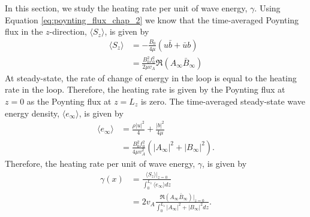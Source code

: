 In this section, we study the heating rate per unit of wave energy, $\gamma$. Using Equation \eqref{eq:poynting_flux_chap_2} we know that the time-averaged Poynting flux in the $z$-direction, $\langle S_z \rangle$, is given by
\begin{equation}
    \begin{aligned}
    \langle S_z \rangle &= -\frac{B_0}{4\mu}(u\bar{b} + \bar{u}b) \\
    &= \frac{B_0^2f_0^2}{2\mu v_A}\Re(A_\infty\bar{B}_\infty)
    \end{aligned}
\end{equation}
At steady-state, the rate of change of energy in the loop is equal to the heating rate in the loop. Therefore, the heating rate is given by the Poynting flux at $z=0$ as the Poynting flux at $z=L_z$ is zero. The time-averaged steady-state wave energy density, $\langle e_\infty \rangle$, is given by
\begin{equation}
    \begin{aligned}
    \langle e_\infty \rangle &= \frac{\rho |u|^2}{4} + \frac{|b|^2}{4\mu} \\
    &= \frac{B_0^2f_0^2}{4\mu v_A^2}(|A_\infty|^2 + |B_\infty|^2).
    \end{aligned}
\end{equation}
Therefore, the heating rate per unit of wave energy, $\gamma$, is given by
\begin{equation}
    \label{eq:gamma_exact_closed_loop}
    \begin{aligned}
    \gamma(x) &= \frac{\langle S_z \rangle|_{z=0}}{\int_{0}^{L_z}\langle e_\infty \rangle dz} \\
    &=2v_A\frac{\Re(A_\infty \bar{B}_\infty)|_{z=0}}{\int_{0}^{L_z}|A_\infty|^2 + |B_\infty|^2dz}.
    \end{aligned}
\end{equation}

